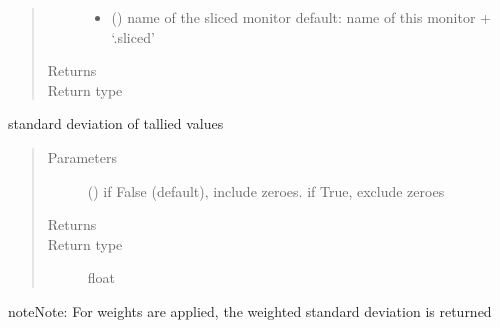 \documentclass[letterpaper,10pt,english]{sphinxmanual}
\begin{document}
\begin{fulllineitems}
\begin{fulllineitems}
\begin{quote}
\begin{description}
\begin{itemize}
\item {} 
 () \textendash{} name of the sliced monitor 
default: name of this monitor + ‘.sliced’

\end{itemize}

\item[{Returns}] \leavevmode
{}

\item[{Return type}] \leavevmode
{\hyperref[\detokenize{Reference:salabim.Monitor}]{}}

\end{description}\end{quote}

\end{fulllineitems}


\begin{fulllineitems}
\label{\detokenize{Reference:salabim.Monitor.std}}
standard deviation of tallied values
\begin{quote}\begin{description}
\item[{Parameters}] \leavevmode
{} () \textendash{} if False (default), include zeroes. if True, exclude zeroes

\item[{Returns}] \leavevmode
{}

\item[{Return type}] \leavevmode
float

\end{description}\end{quote}

\begin{sphinxadmonition}{note}{Note:}
For weights are applied, the weighted standard deviation is returned
\end{sphinxadmonition}

\end{fulllineitems}



\end{fulllineitems}
\end{document}
